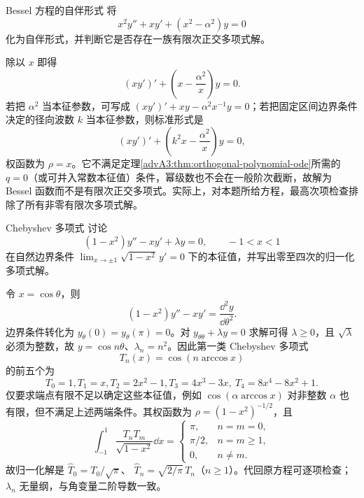 \begin{advexamplebox}{Bessel 方程的自伴形式}\label{advA3:ex:bessel-sl}
将
\[
 x^2y''+xy'+(x^2-\alpha^2)y=0
\]
化为自伴形式，并判断它是否存在一族有限次正交多项式解。

\AQBessel
\end{advexamplebox}
\begin{advsolution}
\AABessel

除以 $x$ 即得
\[
 \boxed{(xy')'+\left(x-\frac{\alpha^2}{x}\right)y=0}.
\]
若把 $\alpha^2$ 当本征参数，可写成
$(xy')'+xy-\alpha^2x^{-1}y=0$；若把固定区间边界条件决定的径向波数 $k$ 当本征参数，则标准形式是
\[
 (xy')'+\left(k^2x-\frac{\alpha^2}{x}\right)y=0,
\]
权函数为 $\rho=x$。它不满足定理\ref{advA3:thm:orthogonal-polynomial-ode}所需的 $q=0$（或可并入常数本征值）条件，幂级数也不会在一般阶次截断，故解为 Bessel 函数而不是有限次正交多项式。实际上，对本题所给方程，最高次项检查排除了所有非零有限次多项式解。
\end{advsolution}

\begin{advexamplebox}{Chebyshev 多项式}\label{advA3:ex:chebyshev}
讨论
\[
 (1-x^2)y''-xy'+\lambda y=0,\qquad -1<x<1
\]
在自然边界条件 $\lim_{x\to\pm1}\sqrt{1-x^2}\,y'=0$ 下的本征值，并写出零至四次的归一化多项式解。

\AQChebyshev
\end{advexamplebox}
\begin{advsolution}
\AAChebyshev

令 $x=\cos\theta$，则
\[
 (1-x^2)y''-xy'=\frac{\dd^2y}{\dd\theta^2}.
\]
边界条件转化为 $y_\theta(0)=y_\theta(\pi)=0$。对 $y_{\theta\theta}+\lambda y=0$ 求解可得 $\lambda\ge0$，且 $\sqrt\lambda$ 必须为整数，故
$y=\cos n\theta$、$\lambda_n=n^2$。因此第一类 Chebyshev 多项式
\[
 T_n(x)=\cos(n\arccos x)
\]
的前五个为
\[
 T_0=1, T_1=x, T_2=2x^2-1, T_3=4x^3-3x,
\ T_4=8x^4-8x^2+1.
\]
仅要求端点有限不足以确定这些本征值，例如 $\cos(\alpha\arccos x)$ 对非整数 $\alpha$ 也有限，但不满足上述两端条件。其权函数为 $\rho=(1-x^2)^{-1/2}$，且
\[
 \int_{-1}^1\frac{T_nT_m}{\sqrt{1-x^2}}\dd x
 =\begin{cases}\pi,&n=m=0,\\\pi/2,&n=m\ge1,\\0,&n\ne m.
 \end{cases}
\]
故归一化解是 $\widehat T_0=T_0/\sqrt\pi$、
$\widehat T_n=\sqrt{2/\pi}\,T_n$（$n\ge1$）。代回原方程可逐项检查；$\lambda_n$ 无量纲，与角变量二阶导数一致。
\end{advsolution}

